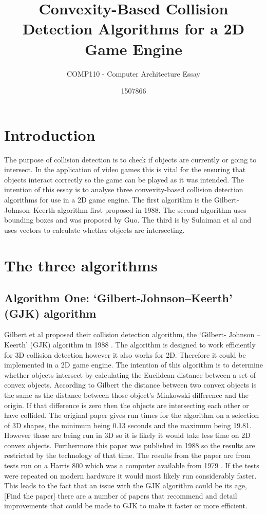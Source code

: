 \documentclass{scrartcl}
\title{Convexity-Based Collision Detection Algorithms for a 2D Game Engine}
\subtitle{COMP110 - Computer Architecture Essay}
\author{1507866}
\begin{document}
\maketitle


\section{Introduction}

The purpose of collision detection is to check if objects are currently or going to intersect. In the application of video games this is vital for the ensuring that objects interact correctly so the game can be played as it was intended.  The intention of this essay is to analyse three convexity-based collision detection algorithms for use in a 2D game engine. The first algorithm is the Gilbert- Johnson–Keerth algorithm first proposed in 1988. The second algorithm uses bounding boxes and was proposed by Guo. The third is by Sulaiman et al and uses vectors to calculate whether objects are intersecting. 

\section{The three algorithms}
\subsection{Algorithm One: ‘Gilbert-Johnson–Keerth’ (GJK) algorithm}
Gilbert et al proposed their collision detection algorithm, the ‘Gilbert- Johnson – Keerth’ (GJK) algorithm in 1988 \cite{GJK}. The algorithm is designed to work efficiently for 3D collision detection however it also works for 2D. Therefore it could be implemented in a 2D game engine. The intention of this algorithm is to determine whether objects intersect by calculating the Eucildean distance between a set of convex objects. According to Gilbert the distance between two convex objects is the same as the distance between those object’s Minkowski difference and the origin. If that difference is zero then the objects are intersecting each other or have collided.
\newline 
The original paper gives run times for the algorithm on a selection of 3D shapes, the minimum being 0.13 seconds and the maximum being 19.81. However these are being run in 3D so it is likely it would take less time on 2D convex objects. Furthermore this paper was published in 1988 so the results are restricted by the technology of that time. The results from the paper are from tests run on a Harris 800 which was a computer available from 1979 \cite{harris800}. If the tests were repeated on modern hardware it would most likely run considerably faster.
This leads to the fact that an issue with the GJK algorithm could be its age, [Find the paper] there are a number of papers that recommend and detail improvements that could be made to GJK to make it faster or more efficient. 
\end{document}
